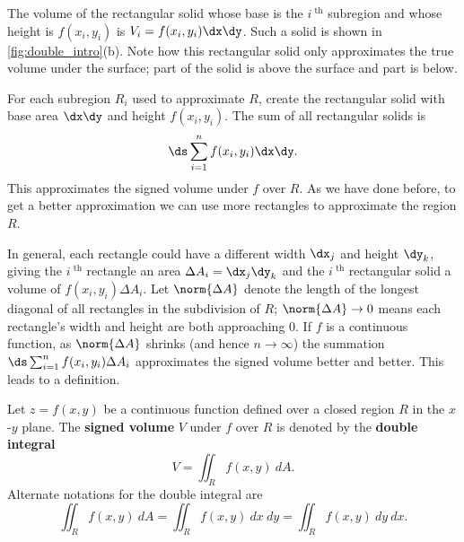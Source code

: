 The volume of the rectangular solid whose base is the $i^\text{ th}$ subregion and whose height is $f(x_i,y_i)$ is $V_i=f(x_i,y_i)\dx\dy$. Such a  solid is shown in \autoref{fig:double_intro}(b). Note how this rectangular solid only approximates the true volume under the surface; part of the solid is above the surface and part is below.

For each subregion $R_i$ used to approximate $R$, create the rectangular solid with base area $\dx\dy$ and height $f(x_i,y_i)$. 
The sum of all rectangular solids is $$\ds \sum_{i=1}^n f(x_i,y_i)\dx\dy.$$ This approximates the signed volume under $f$ over $R$. As we have done before, to get a better approximation we can use more rectangles to approximate the region $R$.

In general, each rectangle could have a different width $\dx_j$ and height $\dy_k$, giving the $i^\text{ th}$ rectangle an area $\Delta A_i = \dx_j\dy_k$ and the $i^\text{ th}$ rectangular solid a volume of $f(x_i,y_i)\Delta A_i$. Let $\norm{\Delta A}$ denote the length of the longest diagonal of all rectangles in the subdivision of $R$; $\norm{\Delta A}\to 0$ means each rectangle's width and height are both approaching 0. If $f$ is a continuous function, as $\norm{\Delta A}$ shrinks (and hence $n\to\infty$) the summation $\ds \sum_{i=1}^n f(x_i,y_i)\Delta A_i$ approximates the signed volume better and better. This leads to a definition.


{Let $z=f(x,y)$ be a continuous function defined over a closed region $R$ in the $x$-$y$ plane. The \textbf{signed volume} $V$ under $f$ over $R$ is denoted by the \textbf{double integral}
$$V = \iint_R f(x,y)\ dA.$$
Alternate notations for the double integral are
$$\iint_R f(x,y)\ dA=\iint_R f(x,y)\ dx\ dy=\iint_R f(x,y)\ dy\ dx.$$}

